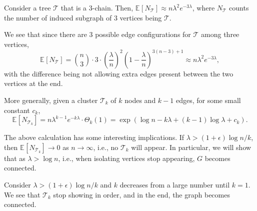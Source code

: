 \begin{eg}
	Consider a tree \(\mathcal{T} \) that is a \(3\)-chain. Then, \(\mathbb{E}_{}[N_{\mathcal{T} }] \approx n \lambda ^2 e^{-3\lambda }\), where \(N_{\mathcal{T} } \) counts the number of induced subgraph of \(3\) vertices being \(\mathcal{T} \).
	\begin{center}
	\end{center}
\end{eg}
\begin{explanation}
	We see that since there are \(3\) possible edge configurations for \(\mathcal{T} \) among three vertices,
	\[
		\mathbb{E}_{}[N_{\mathcal{T} } ]
		= \binom{n}{3} \cdot 3 \cdot \left( \frac{\lambda }{n} \right) ^{2} \left( 1 - \frac{\lambda}{n} \right) ^{3(n-3) + 1}
		\approx n \lambda ^2 e^{-3\lambda },
	\]
	with the difference being not allowing extra edges present between the two vertices at the end.
\end{explanation}

\begin{eg}
	More generally, given a cluster \(\mathcal{T} _k\) of \(k\) nodes and \(k-1\) edges, for some small constant \(c_k\),
	\[
		\mathbb{E}_{}[N_{\mathcal{T} _k} ]
		= n \lambda ^{k-1} e^{-k \lambda } \cdot \Theta _{k} (1)
		= \exp (\log n - k \lambda + (k-1) \log \lambda + c_k).
	\]
\end{eg}

The above calculation has some interesting implications. If \(\lambda > (1 + \epsilon ) \log n / k\), then \(\mathbb{E}_{}[N_{\mathcal{T} _k}] \to 0\) as \(n \to \infty \), i.e., no \(\mathcal{T} _k\) will appear. In particular, we will show that as \(\lambda > \log n\), i.e., when isolating vertices stop appearing, \(G\) becomes connected.

\begin{intuition}
	Consider \(\lambda >(1 + \epsilon ) \log n / k\) and \(k\) decreases from a large number until \(k = 1\). We see that \(\mathcal{T} _k\) stop showing in order, and in the end, the graph becomes connected.
\end{intuition}